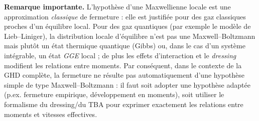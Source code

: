 \begin{mdframed}
\medskip

\noindent\textbf{Remarque importante.} L'hypothèse d'une Maxwellienne locale est une approximation \emph{classique} de fermeture : elle est justifiée pour des gaz classiques proches d'un équilibre local. Pour des gaz quantiques (par exemple le modèle de Lieb–Liniger), la distribution locale d'équilibre n'est pas une Maxwell–Boltzmann mais plutôt un état thermique quantique (Gibbs) ou, dans le cas d'un système intégrable, un état \emph{GGE} local ; de plus les effets d'interaction et le \emph{dressing} modifient les relations entre moments.  
Par conséquent, dans le contexte de la GHD complète, la fermeture ne résulte pas automatiquement d'une hypothèse simple de type Maxwell–Boltzmann : il faut soit adopter une hypothèse adaptée (p.ex. fermeture empirique, développement en moments), soit utiliser le formalisme du dressing/du TBA pour exprimer exactement les relations entre moments et vitesses effectives.
\end{mdframed}

